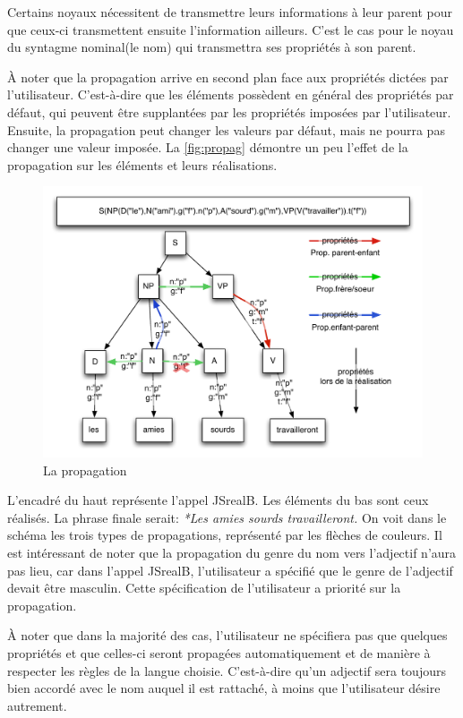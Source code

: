 \documentclass[11pt]{article} %
\newcommand{\system}[1]{\textsf{#1}}
\newcommand{\JSB}{\system{JSrealB}}
\newcommand{\real}[1]{\emph{#1}}
\begin{document}
Certains noyaux nécessitent de transmettre leurs informations à leur
parent pour que ceux-ci transmettent ensuite l'information ailleurs.
C'est le cas pour le noyau du syntagme nominal(le nom) qui transmettra
ses propriétés à son parent.

À noter que la propagation arrive en second plan face aux propriétés
dictées par l'utilisateur. C'est-à-dire que les éléments possèdent
en général des propriétés par défaut, qui peuvent être supplantées
par les propriétés imposées par l'utilisateur. Ensuite, la propagation
peut changer les valeurs par défaut, mais ne pourra pas changer une
valeur imposée. La \autoref{fig:propag} démontre un peu l'effet de la propagation
sur les éléments et leurs réalisations.
\begin{figure}
\caption{La propagation}
\label{fig:propag}
\includegraphics[scale=0.8]{Propagation}
\end{figure}

L'encadré du haut représente l'appel \JSB{}. Les éléments du bas sont ceux
réalisés. La phrase finale serait: \real{*Les amies sourds travailleront.}
On voit dans le schéma les trois types de propagations, représenté
par les flèches de couleurs. Il est intéressant de noter que la propagation
du genre du nom vers l'adjectif n'aura pas lieu, car dans l'appel
\JSB{}, l'utilisateur a spécifié que le genre de l'adjectif devait
être masculin. Cette spécification de l'utilisateur a priorité sur
la propagation.

À noter que dans la majorité des cas, l'utilisateur ne spécifiera pas
que quelques propriétés et que celles-ci seront propagées automatiquement
et de manière à respecter les règles de la langue choisie. C'est-à-dire qu'un
adjectif sera toujours bien accordé avec le nom auquel il est rattaché, à moins
que l'utilisateur désire autrement.
\end{document}

